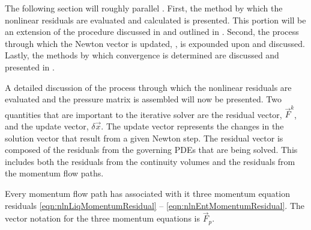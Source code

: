 The following section will roughly parallel .
First, the method by which the nonlinear residuals are evaluated and calculated is presented.
This portion will be an extension of the procedure discussed in  and outlined in .
Second, the process through which the Newton vector is updated, , is expounded upon and  discussed.
Lastly, the methods by which convergence is determined are discussed and presented in .

A detailed discussion of the process through which the nonlinear residuals are evaluated and the pressure matrix is assembled will now be presented.
Two quantities that are important to the iterative solver are the residual vector, $\vec{F}^{k}$, and the update vector, $\delta \vec{x}$.
The update vector represents the changes in the solution vector that result from a given Newton step.
The residual vector is composed of the residuals from the governing PDEs that are being solved.
This includes both the residuals from the continuity volumes and the residuals from the momentum flow paths.

Every momentum flow path has associated with it three momentum equation residuals \eqref{eqn:nlnLiqMomentumResidual} -- \eqref{eqn:nlnEntMomentumResidual}.
The vector notation for the three momentum equations is $\vec{F}_{p}$.

